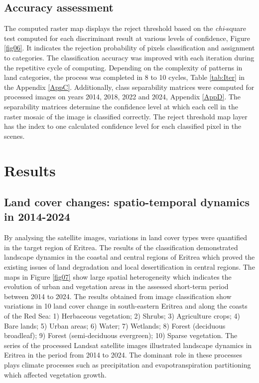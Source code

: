 \documentclass[sn-mathphys-num]{sn-jnl}%
\theoremstyle{thmstyleone}%
\theoremstyle{thmstyletwo}%
\theoremstyle{thmstylethree}%
\begin{document}
\subsection{Accuracy assessment}

The{ computed }raster map displays the reject threshold{ }based on the \emph{chi}-square test computed for each discriminant result at various{ }levels of confidence, Figure \ref{fig06}. {It indicates the} rejection probability of pixels classification and assignment to {categories}. The {classification} accuracy{ }was improved with each iteration during the repetitive cycle of computing. Depending on the complexity of patterns in land categories, the{ }process{ }was completed in{ }8 to 10 cycles, Table \ref{tab:Iter} in the Appendix \ref{AppC}. Additionally, class separability matrices were computed for processed images on years 2014, 2018, 2022 and 2024{, }Appendix \ref{AppD}. The {separability matrices} determine the confidence level at which each cell in the raster mosaic of the{ }image is classified correctly. The reject threshold map layer has the index to one calculated confidence level for each classified pixel in the scenes. 

\section{Results}\label{sec2}

\subsection{Land cover changes: spatio-temporal dynamics in 2014-2024}

{By analysing the satellite images, variations in land cover types were quantified in the target region of Eritrea. The results of the classification demonstrated landscape dynamics in the coastal and central regions of Eritrea which proved the existing issues of land degradation and local desertification in central regions. The maps in Figure} \ref{fig07} {show large spatial heterogeneity which indicates the evolution of urban and vegetation areas in the assessed short-term period between 2014 to 2024.} The results obtained from image classification show variations in 10 land cover change in south-eastern Eritrea and along the coasts of the Red Sea: 1) Herbaceous vegetation; 2) Shrubs; 3) Agriculture crops; 4) Bare lands; 5) Urban areas; 6) Water; 7) Wetlands; 8) Forest (deciduous broadleaf); 9) Forest (semi-deciduous evergreen); 10) Sparse vegetation. The series of {the processed }Landsat{ }satellite images{ }illustrated { landscape dynamics in }Eritrea in {the} period {from }2014 to 2024. {The dominant role in these processes plays climate processes such as} precipitation and evapotranspiration partitioning which {affected vegetation growth}. 
\end{document}
